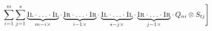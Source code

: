 \begin{align*}
    &\hspace{15pt}  \sum_{i=1}^{m} \sum_{j=1}^{s}  \underbrace{\textsc{Il} \cdot \ldots \cdot \textsc{Il}}_{m-i \times } \cdot  \underbrace{\textsc{Ir} \cdot \ldots \cdot \textsc{Ir}}_{i-1 \times } \cdot \underbrace{\textsc{Il} \cdot \ldots \cdot \textsc{Il}}_{s-j \times } \cdot  \underbrace{\textsc{Ir} \cdot \ldots \cdot \textsc{Ir}}_{j-1 \times }\cdot  \hspace{2pt} Q_{ni} \otimes S_{tj} \Bigg]

\end{align*}
